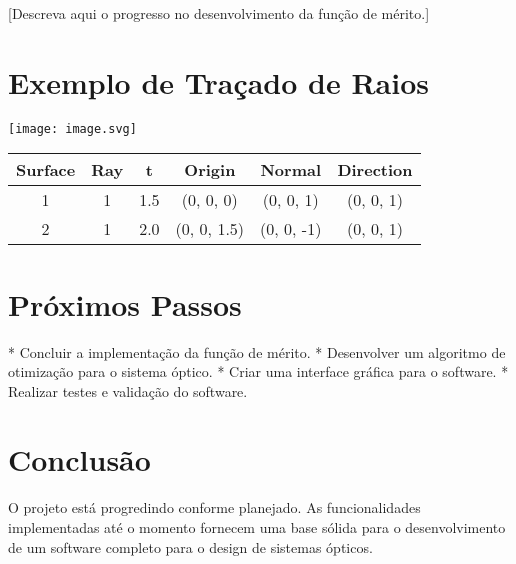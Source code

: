 \documentclass[a4paper,brazilian,12pt]{article}
\begin{document}
[Descreva aqui o progresso no desenvolvimento da função de mérito.]

\section{Exemplo de Traçado de Raios}

\begin{center}
    \texttt{[image: image.svg]}
\end{center}

\begin{center}
    \begin{tabular}{cccccc}
        \toprule
        Surface & Ray & t & Origin & Normal & Direction \\
        \midrule
        1 & 1 & 1.5 & (0, 0, 0) & (0, 0, 1) & (0, 0, 1) \\
        2 & 1 & 2.0 & (0, 0, 1.5) & (0, 0, -1) & (0, 0, 1) \\
        \bottomrule
    \end{tabular}
\end{center}

\section{Próximos Passos}

* Concluir a implementação da função de mérito.
* Desenvolver um algoritmo de otimização para o sistema óptico.
* Criar uma interface gráfica para o software.
* Realizar testes e validação do software.

\section{Conclusão}

O projeto está progredindo conforme planejado. As funcionalidades implementadas até o momento fornecem uma base sólida para o desenvolvimento de um software completo para o design de sistemas ópticos.
\end{document}
